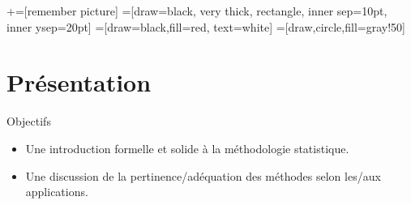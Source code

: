 \usetikzlibrary{positioning}
\usetikzlibrary{snakes}
\usetikzlibrary{calc}
\usetikzlibrary{arrows}
\usetikzlibrary{decorations.markings}
\usetikzlibrary{shapes.misc}
\usetikzlibrary{matrix,shapes,arrows,fit,tikzmark}
\usetikzlibrary{shapes}
\newcommand\marktopleft[1]{%
    \tikz[overlay,remember picture] 
        \node (marker-#1-a) at (-.3em,.3em) {};%
}
\newcommand\markbottomright[2]{%
    \tikz[overlay,remember picture] 
        \node (marker-#1-b) at (0em,0em) {};%
}
+=[remember picture] 
 =[draw=black, very thick, rectangle, inner sep=10pt, inner ysep=20pt]
 =[draw=black,fill=red, text=white]
=[draw,circle,fill=gray!50]



\begin{frame}
\titlepage
\end{frame}
\begin{frame}
 \tableofcontents
    \end{frame}


\section{Présentation}
\frame{\sectionpage}

\begin{frame}[allowframebreaks]{Objectifs}
\begin{itemize}
    \item Une introduction formelle et solide à la méthodologie statistique.
    \item Une discussion de la pertinence/adéquation des méthodes selon les/aux applications.
\end{itemize}
\end{frame}

